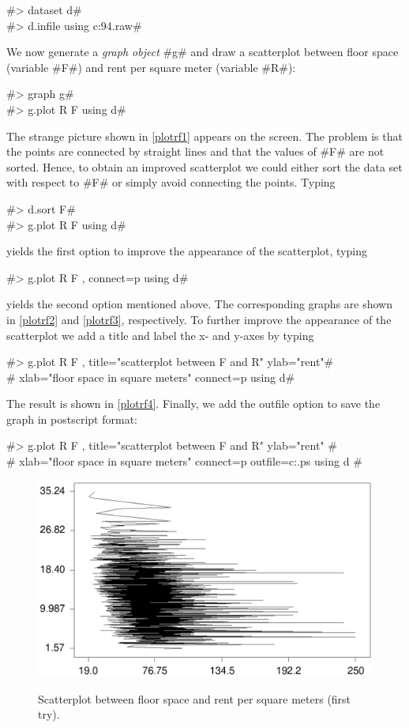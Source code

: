 #> dataset d# \\
#> d.infile using c:\bayesx\examples\rent94.raw#

We now generate a {\em graph object} #g# and draw a scatterplot
between floor space (variable #F#)
and rent per square meter (variable #R#):

#> graph g# \\
#> g.plot R F using d#

The strange picture shown in \autoref{plotrf1} appears on the
screen. The problem is that the points are connected by straight
lines and that the values of #F# are not sorted. Hence, to obtain
an improved scatterplot we could either sort the data set with
respect to #F# or simply avoid connecting the points.
Typing

#> d.sort F# \\
#> g.plot R F using d#

yields the first option to improve the appearance of the scatterplot, typing

#> g.plot R F , connect=p using d#

yields the second option mentioned above. The corresponding graphs
are shown in \autoref{plotrf2} and \autoref{plotrf3},
respectively. To further improve the appearance of the scatterplot
we add a title and label the x- and y-axes
by typing

#> g.plot R F , title="scatterplot between F and R" ylab="rent"# \\
#  xlab="floor space in square meters" connect=p using d#

The result is shown in \autoref{plotrf4}.
Finally, we add the outfile option to save the graph in postscript format:

#> g.plot R F , title="scatterplot between F and R" ylab="rent" #\\
#  xlab="floor space in square meters" connect=p outfile=c:\temp\plotrf.ps using d #

\begin{figure}[ht]
\begin{center}
\includegraphics[scale=0.7]{grafiken/plotrf1.ps}
{\em\caption{ \label{plotrf1} Scatterplot between floor space and
rent per square meters (first try).}}
\end{center}
\end{figure}

